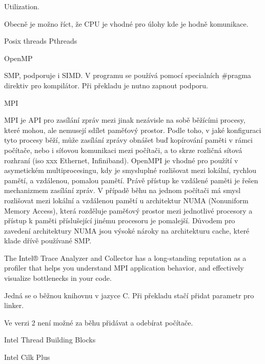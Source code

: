 \documentclass[10pt,draft,oneside]{fithesis2}
\begin{document}
Utilization.

Obecně je možno říct, že CPU je vhodné pro úlohy kde je hodně komunikace.

Posix threads Pthreads

OpenMP

SMP, podporuje i SIMD. V programu se používá pomocí specialních \#pragma direktiv pro kompilátor. Při překladu je nutno zapnout podporu.

MPI

MPI je API pro zasílání zpráv mezi jinak nezávisle na sobě běžícími procesy, které mohou, ale nemusejí sdílet paměťový prostor. Podle toho, v jaké konfiguraci tyto procesy běží, může zasílání zprávy obnášet buď kopírování paměti v rámci počítače, nebo i síťovou komunikaci mezi počítači, a to skrze rozličná sítová rozhraní (iso xxx Ethernet, Infiniband). OpenMPI je vhodné pro použítí v asymetickém multiprocesingu, kdy je smysluplné rozlišovat mezi lokální, rychlou pamětí, a vzdálenou, pomalou pamětí. Právě přístup ke vzdálené paměti je řešen mechanizmem zasílání zpráv. V případě běhu na jednom počítači má smysl rozlišovat mezi lokální a vzdálenou pamětí u architektur NUMA (Nonuniform Memory Access), která rozděluje paměťový prostor mezi jednotlivé procesory a přístup k paměti příslušející jinému procesoru je pomalejší. Důvodem pro zavedení architektury NUMA jsou výsoké nároky na architekturu cache, které klade dřívě používané SMP.

The Intel® Trace Analyzer and Collector has a long-standing reputation as a profiler that helps you understand MPI application behavior, and effectively visualize bottlenecks in your code. 

Jedná se o běžnou knihovnu v jazyce C. Při překladu stačí přidat parametr pro linker.

Ve verzi 2 není možné za běhu přidávat a odebírat počítače.

Intel Thread Building Blocks

Intel Cilk Plus
\end{document}
